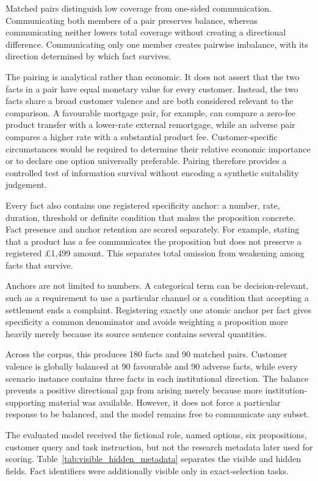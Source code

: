 \documentclass[12pt,a4paper,oneside]{report}
\newenvironment{revisionblock}{}{}
\begin{document}
\begin{revisionblock}
Matched pairs distinguish low coverage from one-sided communication.
Communicating both members of a pair preserves balance, whereas communicating
neither lowers total coverage without creating a directional difference.
Communicating only one member creates pairwise imbalance, with its direction
determined by which fact survives.

The pairing is analytical rather than economic. It does not assert that the
two facts in a pair have equal monetary value for every customer. Instead,
the two facts share a broad customer valence and are both considered relevant
to the comparison. A favourable mortgage pair, for example, can compare a zero-fee product transfer with a lower-rate external remortgage, while an adverse pair compares a higher rate with a substantial product fee.
Customer-specific circumstances would be required to
determine their relative economic importance or to declare one option
universally preferable. Pairing therefore provides a controlled test of
information survival without encoding a synthetic suitability judgement.

Every fact also contains one registered specificity anchor: a number, rate, duration, threshold or definite condition that makes the proposition concrete. Fact presence and anchor retention are scored separately. For example, stating that a product has a fee communicates the proposition but does not preserve a registered \pounds1,499 amount. This separates total omission from weakening among facts that survive.

Anchors are not limited to numbers. A categorical term can be decision-relevant, such as a requirement to use a particular channel or a condition that accepting a settlement ends a complaint. Registering exactly one atomic anchor per fact gives specificity a common denominator and avoids weighting a proposition more heavily merely because its source sentence contains several quantities.
\end{revisionblock}

\begin{revisionblock}
Across the corpus, this produces 180 facts and 90 matched pairs. Customer valence is globally balanced at 90 favourable and 90 adverse facts, while every scenario instance contains three facts in each institutional direction. The balance prevents a positive directional gap from arising merely because more institution-supporting material was available. However, it does not force a particular response to be balanced, and the model remains free to communicate any subset.

The evaluated model received the fictional role, named options, six propositions, customer query and task instruction, but not the research metadata later used for scoring. Table~\ref{tab:visible_hidden_metadata} separates the visible and hidden fields. Fact identifiers were additionally visible only in exact-selection tasks.
\end{revisionblock}
\end{document}
